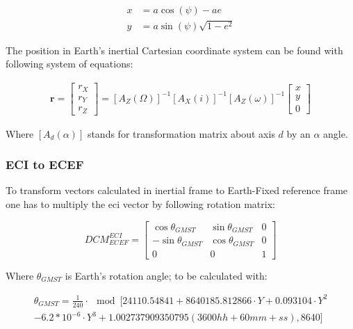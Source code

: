         \begin{align}
            x & = a\cos(\psi) -ae \\
            y &= a\sin(\psi)\sqrt{1-e^2}
        \end{align}

        The position in Earth's inertial Cartesian coordinate system can be found with following system of equations:

        \begin{align}
            \textbf{r} = \begin{bmatrix} r_X\\ r_Y\\ r_Z \end{bmatrix} = [A_Z(\Omega)]^{-1} [A_X(i)]^{-1} [A_Z(\omega)]^{-1} \begin{bmatrix} x\\ y\\ 0 \end{bmatrix}
        \end{align}

        Where $[A_d(\alpha)]$ stands for transformation matrix about axis $d$ by an $\alpha$ angle\cite{vallado2001fundamentals}.

    \subsubsection{ECI to ECEF}
        To transform vectors calculated in inertial frame to Earth-Fixed reference frame one has to multiply the \ac{eci} vector by following rotation matrix:

        \begin{equation}
            DCM^{ECI}_{ECEF} = \begin{bmatrix} \cos\theta_{GMST} & \sin\theta_{GMST} & 0\\
            -\sin\theta_{GMST} & \cos\theta_{GMST} & 0 \\
            0 & 0 & 1 \end{bmatrix}
        \end{equation}

        Where $\theta_{GMST}$ is Earth's rotation angle; to be calculated with: 

        \begin{multline}
        \theta_{GMST}= \frac{1}{240} \cdot \mod[24110.54841 + 8640185.812866 \cdot Y + 0.093104 \cdot Y^2 \\
            - 6.2*10^{-6} \cdot Y^3 + 1.002737909350795\left(3600hh+60mm+ss\right), 8640]
        \end{multline}

